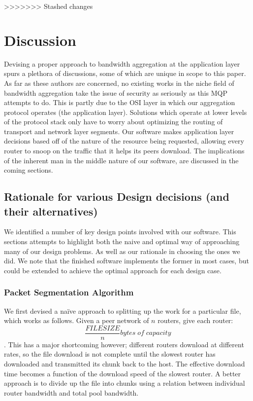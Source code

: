\documentclass[12pt]{article}
\begin{document}
>>>>>>> Stashed changes


\newpage
\section{Discussion}
	
	Devising a proper approach to bandwidth aggregation at the application layer spurs a plethora of discussions, some of which are unique in scope to this paper. As far as these authors are concerned, no existing works in the niche field of bandwidth aggregation take the issue of security as seriously as this MQP attempts to do. This is partly due to the OSI layer in which our aggregation protocol operates (the application layer). Solutions which operate at lower levels of the protocol stack only have to worry about optimizing the routing of transport and network layer segments. Our software makes application layer decisions based off of the nature of the resource being requested, allowing every router to snoop on the traffic that it helps its peers download. The implications of the inherent man in the middle nature of our software, are discussed in the coming sections.

	\subsection{Rationale for various Design decisions (and their alternatives)}

		We identified a number of key design points involved with our software. This sections attempts to highlight both the naive and optimal way of approaching many of our design problems. As well as our rationale in choosing the ones we did. We note that the finished software implements the former in most cases, but could be extended to achieve the optimal approach for each design case. 

		\subsubsection{Packet Segmentation Algorithm}

			We first devised a na\"{i}ve approach to splitting up the work for a particular file, which works as follows. Given a peer network of $n$ routers, give each router: $$\frac{FILESIZE}{n} bytes\; of\; capacity$$. This has a major shortcoming however; different routers download at different rates, so the file download is not complete until the slowest router has downloaded and transmitted its chunk back to the host. The effective download time becomes a function of the download speed of the slowest router. A better approach is to divide up the file into chunks using a relation between individual router bandwidth and total pool bandwidth.
\end{document}
